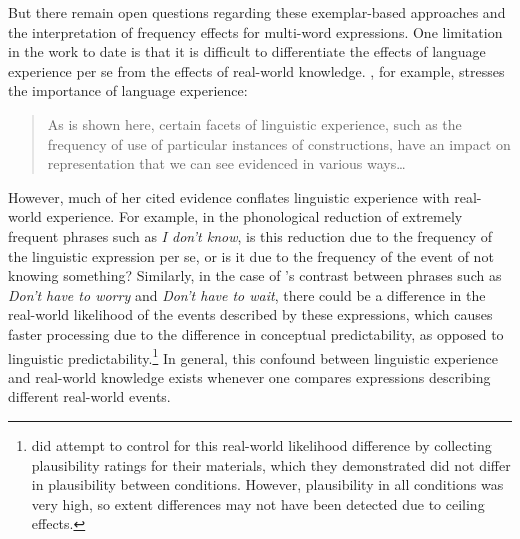 \documentclass[authoryear]{elsarticle}
\begin{document}
But there remain open questions regarding these exemplar-based approaches and the interpretation of frequency effects for multi-word expressions. One limitation in the work to date is that it is difficult to differentiate the effects of language experience per se from the effects of real-world knowledge. \citet{Bybee:2006ul}, for example, stresses the importance of language experience:
\begin{quote}
As is shown here, certain facets of linguistic experience, such as the frequency of use of particular instances of constructions, have an impact on representation that we can see evidenced in various ways\ldots
\end{quote}
However, much of her cited evidence conflates linguistic experience with real-world experience. For example, in the phonological reduction of extremely frequent phrases such as \emph{I don't know}, is this reduction due to the frequency of the linguistic expression per se, or is it due to the frequency of the event of not knowing something? Similarly, in the case of \citeauthor{Arnon:2010hz}'s contrast between phrases such as \emph{Don't have to worry} and \emph{Don't have to wait}, there could be a difference in the real-world likelihood of the events described by these expressions, which causes faster processing due to the difference in conceptual predictability, as opposed to linguistic predictability.\footnote{\citeauthor{Arnon:2010hz} did attempt to control for this real-world likelihood difference by collecting plausibility ratings for their materials, which they demonstrated did not differ in plausibility between conditions. However, plausibility in all conditions was very high, so extent differences may not have been detected due to ceiling effects.}  In general, this confound between linguistic experience and real-world knowledge exists whenever one compares expressions describing different real-world events.
\end{document}
